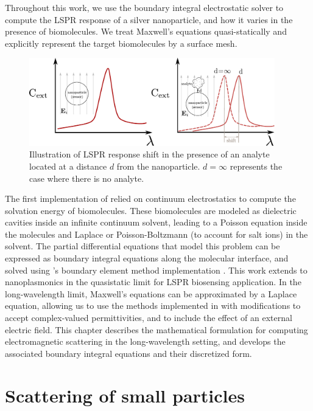 Throughout this work, we use the boundary integral electrostatic solver \pygbe \cite{ClementiETal2017} to compute 
the LSPR response of a silver nanoparticle, and how it varies in the presence of biomolecules. We treat Maxwell's equations
quasi-statically \cite{MayergoyzZhang2007} and explicitly represent the target biomolecules by a surface mesh.

\begin{figure}[h]
   \centering
     \includegraphics[width=0.95\textwidth]{lspr_biosensing.pdf} 
     \caption{Illustration of LSPR response shift in the presence of an analyte located at a distance $d$
     from the nanoparticle. $d=\infty$ represents the case where there is no analyte.}
     \label{fig:lspr_bio}
\end{figure}


The first implementation of \pygbe relied on continuum electrostatics to compute the solvation energy
of biomolecules. These biomolecules are modeled as dielectric cavities inside an infinite continuum 
solvent, leading to a Poisson equation inside the molecules and Laplace or Poisson-Boltzmann
(to account for salt ions) in the solvent. The partial differential equations that model this problem
can be expressed as boundary integral equations along the molecular interface, and solved using 
\pygbe's boundary element method implementation \cite{CooperBardhanBarba2013,CooperClementiBarba2015}.
This work extends \pygbe to nanoplasmonics in the quasistatic limit for LSPR biosensing application. In the long-wavelength limit,
Maxwell's equations can be approximated by a Laplace equation, allowing us to use the methods implemented in \pygbe with modifications
to accept complex-valued permittivities, and to include the effect of an external electric field. This chapter describes the mathematical
formulation for computing electromagnetic scattering in the long-wavelength setting, and develops the associated boundary 
integral equations and their discretized form.

\section{Scattering of small particles} \label{sec:scattering_small}

